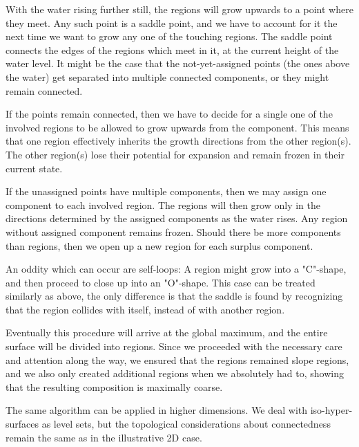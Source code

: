 \documentclass[a4paper,12pt]{paper}
\theoremstyle{plain}
\theoremstyle{definition}
\begin{document}
With the water rising further still, the regions will grow upwards to a point where they meet. Any such point is a saddle point, and we have to account for it the next time we want to grow any one of the touching regions. The saddle point connects the edges of the regions which meet in it, at the current height of the water level. It might be the case that the not-yet-assigned points (the ones above the water) get separated into multiple connected components, or they might remain connected.

If the points remain connected, then we have to decide for a single one of the involved regions to be allowed to grow upwards from the component. This means that one region effectively inherits the growth directions from the other region(s). The other region(s) lose their potential for expansion and remain frozen in their current state.

If the unassigned points have multiple components, then we may assign one component to each involved region. The regions will then grow only in the directions determined by the assigned components as the water rises. Any region without assigned component remains frozen. Should there be more components than regions, then we open up a new region for each surplus component.

An oddity which can occur are self-loops: A region might grow into a "C"-shape, and then proceed to close up into an "O"-shape. This case can be treated similarly as above, the only difference is that the saddle is found by recognizing that the region collides with itself, instead of with another region.

Eventually this procedure will arrive at the global maximum, and the entire surface will be divided into regions. Since we proceeded with the necessary care and attention along the way, we ensured that the regions remained slope regions, and we also only created additional regions when we absolutely had to, showing that the resulting composition is maximally coarse.

The same algorithm can be applied in higher dimensions. We deal with iso-hyper-surfaces as level sets, but the topological considerations about connectedness remain the same as in the illustrative 2D case.




\end{document}
